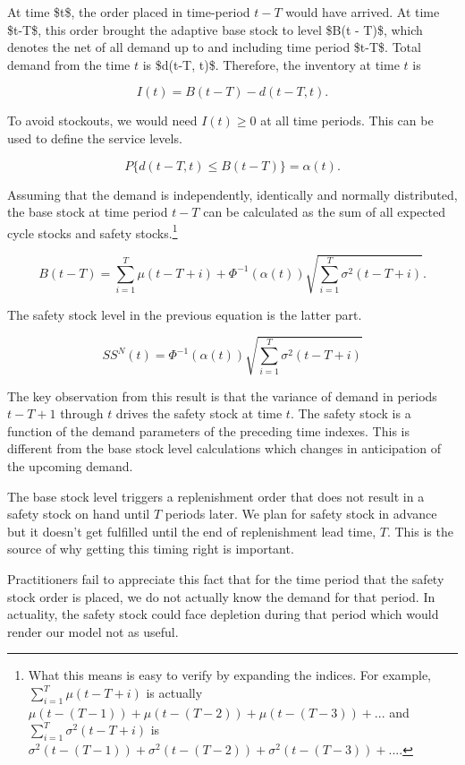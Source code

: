 \documentclass[,msom,nonblindrev]{informs}
\begin{document}
At time \$t\$, the order placed in time-period \(t-T\) would have
arrived. At time \$t-T\$, this order brought the adaptive base stock to
level \$B(t - T)\$, which denotes the net of all demand up to and
including time period \$t-T\$. Total demand from the time \(t\) is
\$d(t-T, t)\$. Therefore, the inventory at time \(t\) is

\[
I(t) = B(t-T) - d(t-T, t).
\]

To avoid stockouts, we would need \(I(t) \geq 0\) at all time periods.
This can be used to define the service levels.

\[
P\{d(t-T, t) \leq B(t-T)\} = \alpha(t).
\]

Assuming that the demand is independently, identically and normally
distributed, the base stock at time period \(t-T\) can be calculated as
the sum of all expected cycle stocks and safety stocks.\footnote{What
  this means is easy to verify by expanding the indices. For example,
  \(\sum_{i = 1}^T \mu(t-T+i)\) is actually
  \(\mu(t - (T-1)) + \mu(t - (T-2)) + \mu(t - (T-3)) +...\) and
  \(\sum_{i = 1}^T \sigma^2(t - T +i)\) is
  \(\sigma^2(t - (T -1)) + \sigma^2(t - (T -2)) + \sigma^2(t - (T -3)) + ...\).}

\[
B(t-T) = \sum_{i = 1}^T \mu(t-T+i) + \Phi^{-1}(\alpha(t)) \sqrt{\sum_{i = 1}^T \sigma^2(t - T +i)}.
\]

The safety stock level in the previous equation is the latter part.

\[
SS^N(t) = \Phi^{-1}(\alpha(t)) \sqrt{\sum_{i = 1}^T \sigma^2(t - T +i)}
\]

The key observation from this result is that the variance of demand in
periods \(t - T + 1\) through \(t\) drives the safety stock at time
\(t\). The safety stock is a function of the demand parameters of the
preceding time indexes. This is different from the base stock level
calculations which changes in anticipation of the upcoming demand.

The base stock level triggers a replenishment order that does not result
in a safety stock on hand until \(T\) periods later. We plan for safety
stock in advance but it doesn't get fulfilled until the end of
replenishment lead time, \(T\). This is the source of why getting this
timing right is important.

Practitioners fail to appreciate this fact that for the time period that
the safety stock order is placed, we do not actually know the demand for
that period. In actuality, the safety stock could face depletion during
that period which would render our model not as useful.
\end{document}
